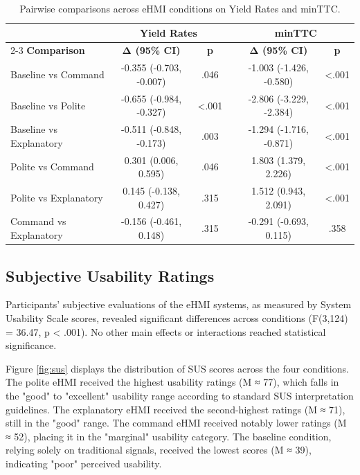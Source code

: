 \documentclass[manuscript,review]{acmart}
\begin{document}
\begin{table}[h]
\centering
\caption{Pairwise comparisons across eHMI conditions on Yield Rates and minTTC.}
\label{tab:comparison_objective}
\begin{tabular}{lccccc}
\toprule
 & \multicolumn{2}{c}{\textbf{Yield Rates}} & & \multicolumn{2}{c}{\textbf{minTTC}} \\
\cmidrule{2-3} \cmidrule{5-6}
\textbf{Comparison} & \textbf{Δ (95\% CI)} & \textbf{p} & & \textbf{Δ (95\% CI)} & \textbf{p} \\
\midrule
Baseline vs Command & -0.355 (-0.703, -0.007) & .046 & & -1.003 (-1.426, -0.580) & <.001 \\
Baseline vs Polite & -0.655 (-0.984, -0.327) & <.001 & & -2.806 (-3.229, -2.384) & <.001 \\
Baseline vs Explanatory & -0.511 (-0.848, -0.173) & .003 & & -1.294 (-1.716, -0.871) & <.001 \\
Polite vs Command & 0.301 (0.006, 0.595) & .046 & & 1.803 (1.379, 2.226) & <.001 \\
Polite vs Explanatory & 0.145 (-0.138, 0.427) & .315 & & 1.512 (0.943, 2.091) & <.001 \\
Command vs Explanatory & -0.156 (-0.461, 0.148) & .315 & & -0.291 (-0.693, 0.115) & .358 \\
\bottomrule
\end{tabular}
\end{table}

\subsection{Subjective Usability Ratings}

Participants' subjective evaluations of the eHMI systems, as measured by System Usability Scale scores, revealed significant differences across conditions (F(3,124) = 36.47, p < .001). No other main effects or interactions reached statistical significance.

Figure \ref{fig:sus} displays the distribution of SUS scores across the four conditions. The polite eHMI received the highest usability ratings (M ≈ 77), which falls in the "good" to "excellent" usability range according to standard SUS interpretation guidelines. The explanatory eHMI received the second-highest ratings (M ≈ 71), still in the "good" range. The command eHMI received notably lower ratings (M ≈ 52), placing it in the "marginal" usability category. The baseline condition, relying solely on traditional signals, received the lowest scores (M ≈ 39), indicating "poor" perceived usability.
\end{document}

